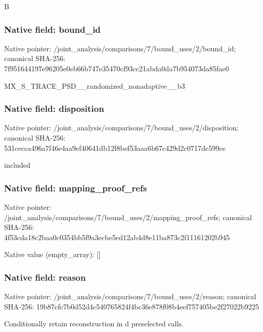 \documentclass[10pt,a4paper]{article}
\begin{document}
\begingroup\raggedright\sloppy B\par\endgroup

\subsubsection{Native field: bound\_\allowbreak{}id}
Native pointer: /joint\_\allowbreak{}analysis/comparisons/7/bound\_\allowbreak{}uses/2/bound\_\allowbreak{}id; canonical SHA-256: 7f951644197e96205e0eb66b747e35470cf93cc21abda0da7b954073da85fae0

\begingroup\raggedright\sloppy MX\_\allowbreak{}S\_\allowbreak{}TRACE\_\allowbreak{}PSD\_\allowbreak{}\_\allowbreak{}randomized\_\allowbreak{}nonadaptive\_\allowbreak{}\_\allowbreak{}b3\par\endgroup

\subsubsection{Native field: disposition}
Native pointer: /joint\_\allowbreak{}analysis/comparisons/7/bound\_\allowbreak{}uses/2/disposition; canonical SHA-256: 531cecca496a7f46e4aa9ef40641db12f8bef53aaa6b67c429d2c0717dc599ce

\begingroup\raggedright\sloppy included\par\endgroup

\subsubsection{Native field: mapping\_\allowbreak{}proof\_\allowbreak{}refs}
Native pointer: /joint\_\allowbreak{}analysis/comparisons/7/bound\_\allowbreak{}uses/2/mapping\_\allowbreak{}proof\_\allowbreak{}refs; canonical SHA-256: 4f53cda18c2baa0c0354bb5f9a3ecbe5ed12ab4d8e11ba873c2f11161202b945

Native value (empty\_\allowbreak{}array): []

\subsubsection{Native field: reason}
Native pointer: /joint\_\allowbreak{}analysis/comparisons/7/bound\_\allowbreak{}uses/2/reason; canonical SHA-256: 19b87cfc7b0d52d4c540765824f4bc36e878f08b4eef757405be2f27022b9225

\begingroup\raggedright\sloppy Conditionally retain reconstruction in d preselected calls.\par\endgroup
\end{document}
